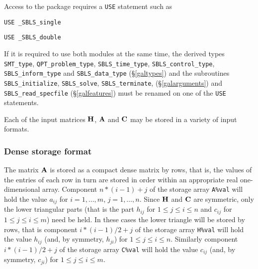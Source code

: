 \documentclass{galahad}
\newcommand{\packagename}{SBLS}
\newcommand{\fullpackagename}{\libraryname\_\packagename}
\begin{document}
\galhowto


Access to the package requires a {\tt USE} statement such as

\medskip{}

\hspace{8mm} {\tt USE \fullpackagename\_single}

\medskip{}

\hspace{8mm} {\tt USE  \fullpackagename\_double}

\medskip

\noindent
If it is required to use both modules at the same time, the derived types 
{\tt SMT\_type}, 
{\tt QPT\_problem\_type}, 
{\tt \packagename\_time\_type}, 
{\tt \packagename\_control\_type}, 
{\tt \packagename\_inform\_type} 
and
{\tt \packagename\_data\_type}
(\S\ref{galtypes})
and the subroutines
{\tt \packagename\_initialize}, 
{\tt \packagename\_\-solve},
{\tt \packagename\_terminate},
(\S\ref{galarguments})
and 
{\tt \packagename\_read\_specfile}
(\S\ref{galfeatures})
must be renamed on one of the {\tt USE} statements.


\galmatrix
Each of the input matrices ${\mathbf{H}}$, ${\mathbf{A}}$ and ${\mathbf{C}}$
may be stored in a variety of input formats.

\subsubsection{Dense storage format}\label{dense}
The matrix ${\mathbf{A}}$ is stored as a compact 
dense matrix by rows, that is, the values of the entries of each row in turn are
stored in order within an appropriate real one-dimensional array.
Component $n \ast (i-1) + j$ of the storage array {\tt A\%val} will hold the 
value $a_{ij}$ for $i = 1, \ldots , m$, $j = 1, \ldots , n$.
Since ${\mathbf{H}}$ and ${\mathbf{C}}$ are symmetric, only the lower triangular parts 
(that is the part $h_{ij}$ for $1 \leq j \leq i \leq n$ and
$c_{ij}$ for $1 \leq j \leq i \leq m$) need be held. In these cases
the lower triangle will be stored by rows, that is 
component $i \ast (i-1)/2 + j$ of the storage array {\tt H\%val}  
will hold the value $h_{ij}$ (and, by symmetry, $h_{ji}$)
for $1 \leq j \leq i \leq n$. Similarly
component $i \ast (i-1)/2 + j$ of the storage array {\tt C\%val}  
will hold the value $c_{ij}$ (and, by symmetry, $c_{ji}$)
for $1 \leq j \leq i \leq m$.
\end{document}
